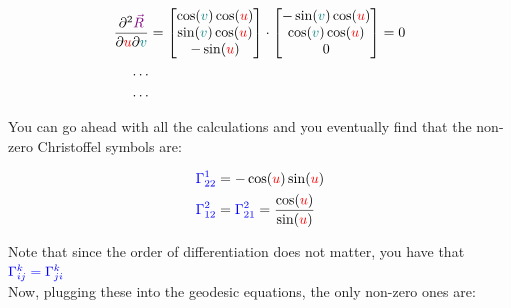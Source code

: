 \begin{align*}
    \frac{\partial^2 \begingroup\color{violet}\vec{R}\endgroup}{\partial \begingroup\color{red}u\endgroup\partial \begingroup\color{teal}v\endgroup} &= 
    \begin{bmatrix}
        \cos(\begingroup\color{teal}v\endgroup)\cos(\begingroup\color{red}u\endgroup)\\
        \sin(\begingroup\color{teal}v\endgroup)\cos(\begingroup\color{red}u\endgroup)\\
        -\sin(\begingroup\color{red}u\endgroup)
    \end{bmatrix} \cdot
    \begin{bmatrix}
        -\sin(\begingroup\color{teal}v\endgroup)\cos(\begingroup\color{red}u\endgroup)\\
        \cos(\begingroup\color{teal}v\endgroup)\cos(\begingroup\color{red}u\endgroup)\\
        0
    \end{bmatrix} = 0
\\
\dots\\
\dots
\end{align*}

You can go ahead with all the calculations and you eventually find that the non-zero Christoffel symbols are:

\begin{align*}
    \begingroup\color{blue}\Gamma^{1}_{22}\endgroup &= -\cos(\begingroup\color{red}u\endgroup)\sin(\begingroup\color{red}u\endgroup)\\
    \begingroup\color{blue}\Gamma^{2}_{12}\endgroup &= \begingroup\color{blue}\Gamma^{2}_{21}\endgroup = \frac{\cos(\begingroup\color{red}u\endgroup)}{\sin(\begingroup\color{red}u\endgroup)}
\end{align*}

Note that since the order of differentiation does not matter, you have that $\color{blue}\Gamma^{k}_{ij} = \color{blue}\Gamma^{k}_{ji}$\\

Now, plugging these into the geodesic equations, the only non-zero ones are:

